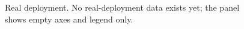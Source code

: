 \documentclass[sigconf]{acmart}
\begin{document}
{\selectfont
\begin{figure}[t]
  \centering
  
  \caption{Real deployment. No real-deployment data exists yet; the panel shows empty axes and legend only.}
  \label{fig:F17_real_deployment}
\end{figure}
}


\end{document}
